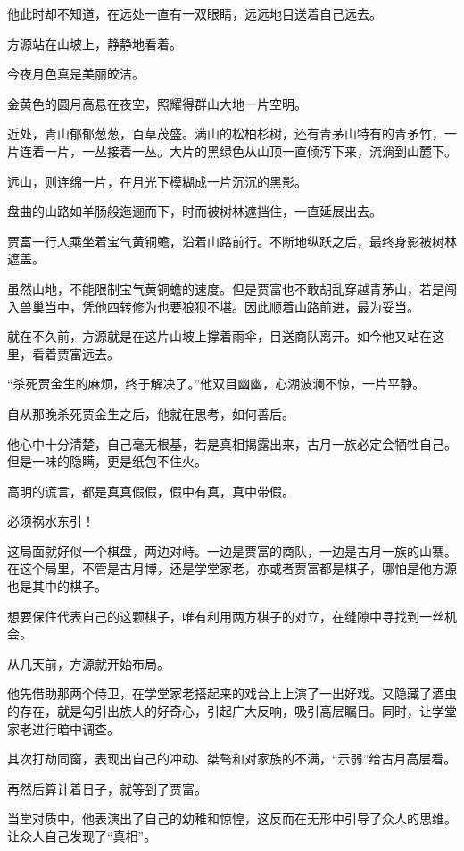 \begin{this_body}
他此时却不知道，在远处一直有一双眼睛，远远地目送着自己远去。

方源站在山坡上，静静地看着。

今夜月色真是美丽皎洁。

金黄色的圆月高悬在夜空，照耀得群山大地一片空明。

近处，青山郁郁葱葱，百草茂盛。满山的松柏杉树，还有青茅山特有的青矛竹，一片连着一片，一丛接着一丛。大片的黑绿色从山顶一直倾泻下来，流淌到山麓下。

远山，则连绵一片，在月光下模糊成一片沉沉的黑影。

盘曲的山路如羊肠般迤逦而下，时而被树林遮挡住，一直延展出去。

贾富一行人乘坐着宝气黄铜蟾，沿着山路前行。不断地纵跃之后，最终身影被树林遮盖。

虽然山地，不能限制宝气黄铜蟾的速度。但是贾富也不敢胡乱穿越青茅山，若是闯入兽巢当中，凭他四转修为也要狼狈不堪。因此顺着山路前进，最为妥当。

就在不久前，方源就是在这片山坡上撑着雨伞，目送商队离开。如今他又站在这里，看着贾富远去。

“杀死贾金生的麻烦，终于解决了。”他双目幽幽，心湖波澜不惊，一片平静。

自从那晚杀死贾金生之后，他就在思考，如何善后。

他心中十分清楚，自己毫无根基，若是真相揭露出来，古月一族必定会牺牲自己。但是一味的隐瞒，更是纸包不住火。

高明的谎言，都是真真假假，假中有真，真中带假。

必须祸水东引！

这局面就好似一个棋盘，两边对峙。一边是贾富的商队，一边是古月一族的山寨。在这个局里，不管是古月博，还是学堂家老，亦或者贾富都是棋子，哪怕是他方源也是其中的棋子。

想要保住代表自己的这颗棋子，唯有利用两方棋子的对立，在缝隙中寻找到一丝机会。

从几天前，方源就开始布局。

他先借助那两个侍卫，在学堂家老搭起来的戏台上上演了一出好戏。又隐藏了酒虫的存在，就是勾引出族人的好奇心，引起广大反响，吸引高层瞩目。同时，让学堂家老进行暗中调查。

其次打劫同窗，表现出自己的冲动、桀骜和对家族的不满，“示弱”给古月高层看。

再然后算计着日子，就等到了贾富。

当堂对质中，他表演出了自己的幼稚和惊惶，这反而在无形中引导了众人的思维。让众人自己发现了“真相”。


\end{this_body}
